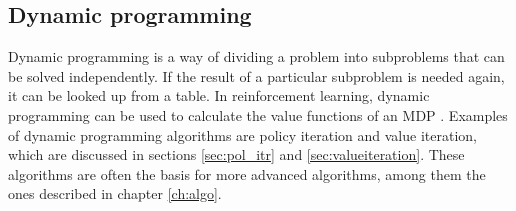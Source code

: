 \subsection{Dynamic programming}

Dynamic programming is a way of dividing a problem into subproblems that can be
solved independently. If the result of a particular subproblem is needed again,
it can be looked up from a table. In reinforcement learning, dynamic
programming can be used to calculate the value functions of an MDP
\parencite{bellman1957mdp}. Examples of dynamic programming algorithms are
policy iteration and value iteration, which are discussed in sections
\ref{sec:pol_itr} and \ref{sec:valueiteration}. These algorithms are often the
basis for more advanced algorithms, among them the ones described in chapter
\ref{ch:algo}.

